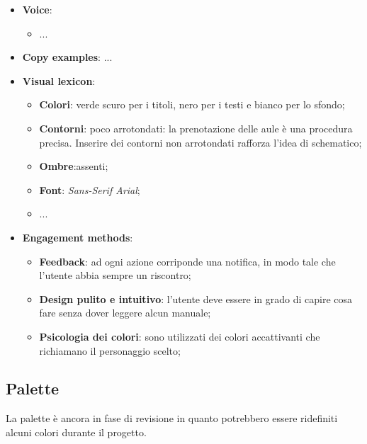 \begin{itemize}
\begin{center}
\begin{tikzpicture}
            \end{tikzpicture}
        \end{center}

    
    \item \textbf{Voice}: 
		\begin{itemize}
            \item ...
		\end{itemize}
    
    \item \textbf{Copy examples}: ...
    
    \item \textbf{Visual lexicon}:
		\begin{itemize}
			\item \textbf{Colori}: verde scuro per i titoli, nero per i testi e bianco per lo sfondo;  
			\item \textbf{Contorni}: poco arrotondati: la prenotazione delle aule è una procedura precisa. Inserire dei contorni non 
            arrotondati rafforza l'idea di schematico; 
			\item \textbf{Ombre}:assenti;
			\item \textbf{Font}: \textit{Sans-Serif Arial};
            \item ...
		\end{itemize}
    
    \item \textbf{Engagement methods}:
		\begin{itemize}
			\item \textbf{Feedback}: ad ogni azione corriponde una notifica, in
				modo tale che l'utente abbia sempre un riscontro;

			\item \textbf{Design pulito e intuitivo}: l'utente deve essere in
				grado di capire cosa fare senza dover leggere alcun manuale;

			\item \textbf{Psicologia dei colori}: sono utilizzati dei colori
				accattivanti che richiamano il personaggio scelto;

		\end{itemize}
\end{itemize}

\subsection{Palette}

La palette è ancora in fase di revisione in quanto potrebbero essere ridefiniti alcuni colori durante il progetto.

